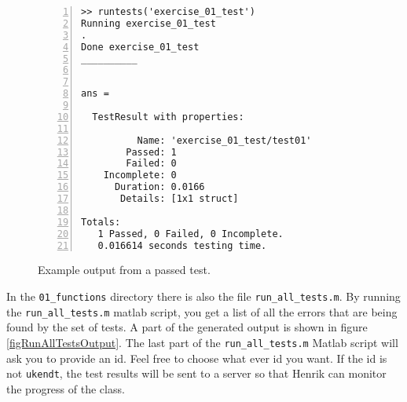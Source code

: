 \begin{figure}
\begin{lstlisting}[basicstyle=\scriptsize, breaklines=true, numbers=left, linebackgroundcolor={\lstcolorlines[yellow]{20}}]
>> runtests('exercise_01_test')
Running exercise_01_test
.
Done exercise_01_test
__________


ans = 

  TestResult with properties:

          Name: 'exercise_01_test/test01'
        Passed: 1
        Failed: 0
    Incomplete: 0
      Duration: 0.0166
       Details: [1x1 struct]

Totals:
   1 Passed, 0 Failed, 0 Incomplete.
   0.016614 seconds testing time.
\end{lstlisting}
\caption{Example output from a passed test.}
\label{figExampleOutputFromAPassedTest}
\end{figure}

In the \verb!01_functions! directory there is also the file \verb!run_all_tests.m!.
By running the \verb!run_all_tests.m! matlab script, you get a list of all the 
errors that are being found by the set of tests.
A part of the generated output is shown in figure \ref{figRunAllTestsOutput}.
The last part of the \verb!run_all_tests.m! Matlab script will ask you to provide an 
id. Feel free to choose what ever id you want. If the id is not \verb!ukendt!, 
the test results will be sent to a server so that Henrik can monitor the progress 
of the class.

